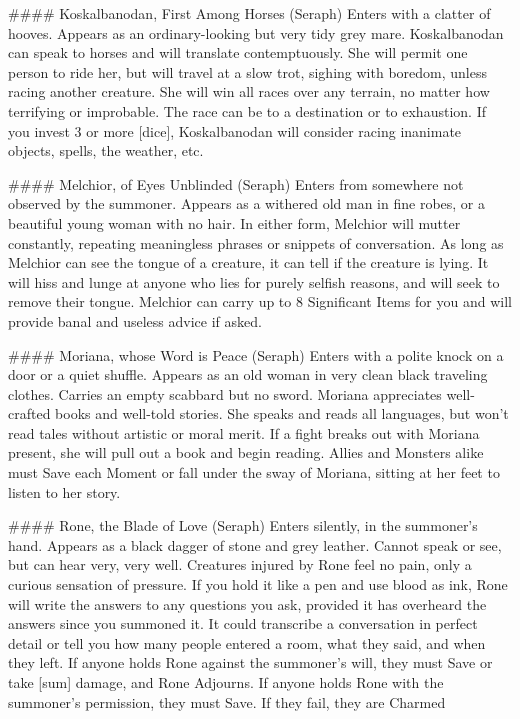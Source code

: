 ####  Koskalbanodan, First Among Horses (Seraph)
Enters with a clatter of hooves. Appears as an ordinary-looking but very tidy grey mare. Koskalbanodan can speak to horses and will translate contemptuously. She will permit one person to ride her, but will travel at a slow trot, sighing with boredom, unless racing another creature. She will win all races over any terrain, no matter how terrifying or improbable. The race can be to a destination or to exhaustion. If you invest 3 or more [dice], Koskalbanodan will consider racing inanimate objects, spells, the weather, etc.


####  Melchior, of Eyes Unblinded (Seraph)
Enters from somewhere not observed by the summoner. Appears as a withered old man in fine robes, or a beautiful young woman with no hair. In either form, Melchior will mutter constantly, repeating meaningless phrases or snippets of conversation. As long as Melchior can see the tongue of a creature, it can tell if the creature is lying. It will hiss and lunge at anyone who lies for purely selfish reasons, and will seek to remove their tongue. Melchior can carry up to 8 Significant Items for you and will provide banal and useless advice if asked.


####  Moriana, whose Word is Peace (Seraph)
Enters with a polite knock on a door or a quiet shuffle. Appears as an old woman in very clean black traveling clothes. Carries an empty scabbard but no sword. Moriana appreciates well-crafted books and well-told stories. She speaks and reads all languages, but won't read tales without artistic or moral merit. If a fight breaks out with Moriana present, she will pull out a book and begin reading. Allies and Monsters alike must Save each Moment or fall under the sway of Moriana, sitting at her feet to listen to her story.




####  Rone, the Blade of Love (Seraph)
Enters silently, in the summoner's hand. Appears as a black dagger of stone and grey leather. Cannot speak or see, but can hear very, very well. Creatures injured by Rone feel no pain, only a curious sensation of pressure. If you hold it like a pen and use blood as ink, Rone will write the answers to any questions you ask, provided it has overheard the answers since you summoned it. It could transcribe a conversation in perfect detail or tell you how many people entered a room, what they said, and when they left. If anyone holds Rone against the summoner's will, they must Save or take [sum] damage, and Rone Adjourns. If anyone holds Rone with the summoner's permission, they must Save. If they fail, they are Charmed

